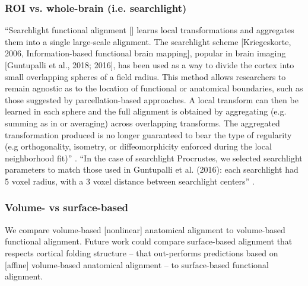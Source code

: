 \subsubsection{ROI vs. whole-brain (i.e. searchlight)}



``Searchlight functional alignment [\citep{zhang2016searchlight,
guntupalli2016model}] learns local transformations and aggregates them into a
single large-scale alignment.
%
The searchlight scheme [Kriegeskorte, 2006, Information-based functional brain
mapping], popular in brain imaging [Guntupalli et al., 2018; 2016], has been
used as a way to divide the cortex into small overlapping spheres of a field
radius.
%
This method allows researchers to remain agnostic as to the location of
functional or anatomical boundaries, such as those suggested by
parcellation-based approaches.
%
A local transform can then be learned in each sphere and the full alignment is
obtained by aggregating (e.g. summing as in \citep{guntupalli2016model} or
averaging) across overlapping transforms.
%
The aggregated transformation produced is no longer guaranteed to bear the type
of regularity (e.g orthogonality, isometry, or diffeomorphicity enforced during
the local neighborhood fit)'' \citep{bazeille2021empirical}.
%
``In the case of searchlight Procrustes, we selected searchlight parameters to
match those used in Guntupalli et al. (2016):
%
each searchlight had 5 voxel radius, with a 3 voxel distance between searchlight
centers'' \citep{bazeille2021empirical}.


\subsubsection{Volume- vs surface-based}




We compare volume-based [nonlinear] anatomical alignment to volume-based
functional alignment.
%
Future work could compare surface-based alignment that respects cortical folding
structure -- that out-performs predictions based on [affine] volume-based
anatomical alignment \citep{weiner2018defining} -- to surface-based functional
alignment.



